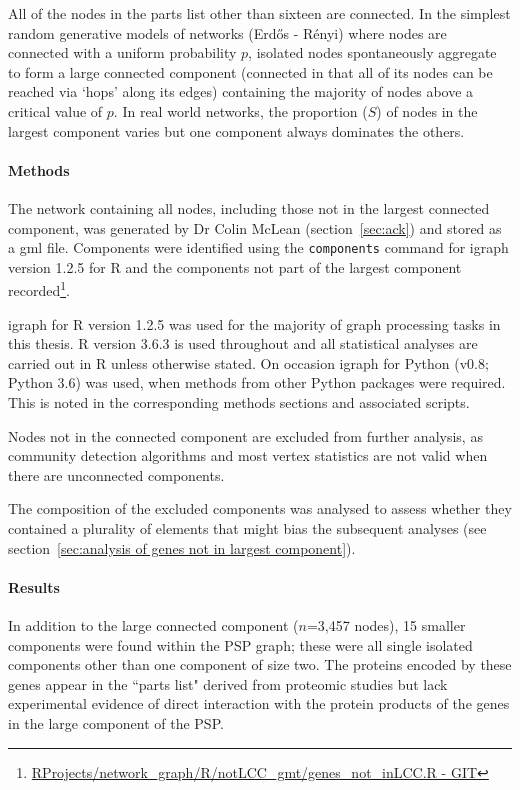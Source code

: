 All of the nodes in the parts list other than sixteen are connected. In the simplest random generative models of networks (Erd{\H{o}}s - R{\'e}nyi\cite{erdHos1960evolution}) where nodes are connected with a uniform probability $p$, isolated nodes spontaneously aggregate to form a large connected component (connected in that all of its nodes can be reached via `hops' along its edges) containing the majority of nodes above a critical value of $p$\cite{newman2018networks}. In real world networks, the proportion ($S$) of nodes in the largest component varies but one component always dominates the others\cite{newman2018networks}.


\paragraph{Methods}
The network containing all nodes, including those not in the largest connected component, was generated by Dr Colin McLean (section~\ref{sec:ack}) and stored as a gml file. Components were identified using the \texttt{components} command for igraph version 1.2.5\cite{csardi2006igraph} for R and the components not part of the largest component recorded\footnote{\url{RProjects/network_graph/R/notLCC_gmt/genes_not_inLCC.R - GIT}}. 

 igraph for R version 1.2.5 was used for the majority of graph processing tasks in this thesis\cite{csardi2006igraph}. R version 3.6.3\cite{ihaka1996r} is used throughout and  all statistical analyses are carried out in R unless otherwise stated. On occasion igraph for Python (v0.8; Python 3.6) was used, when methods from other Python packages were required. This is noted in the corresponding methods sections and associated scripts.

Nodes not in the connected component are excluded from further analysis, as community detection algorithms and most vertex statistics are not valid when there are unconnected components.

The composition of the excluded components was analysed to assess whether they contained a plurality of elements that might bias the subsequent analyses (see section~\ref{sec:analysis of genes not in largest component}). 

\paragraph{Results}
In addition to the large connected component ($n$=3,457 nodes), 15 smaller components were found within the PSP graph; these were all single isolated components other than one component of size two.  The  proteins encoded by these genes appear in the ``parts list" derived from proteomic studies but lack experimental evidence of direct interaction with the protein products of the genes in the large component of the PSP.


